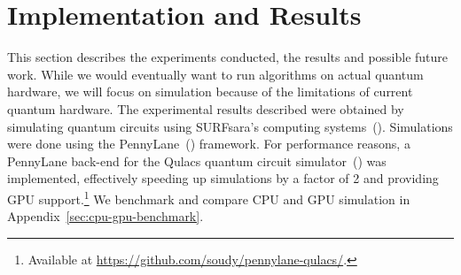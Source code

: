 \documentclass[a4paper,10pt]{article}
\begin{document}
\section{Implementation and Results} \label{sec:implementation-and-results}
This section describes the experiments conducted, the results and possible future work.
While we would eventually want to run algorithms on actual quantum hardware, we will focus on simulation because of the limitations of current quantum hardware.
The experimental results described were obtained by simulating quantum circuits using SURFsara's computing systems~(\cite{surfsara}).
Simulations were done using the PennyLane~(\cite{bergholm2018pennylane}) framework.
For performance reasons, a PennyLane back-end for the Qulacs quantum circuit simulator~(\cite{qulacs}) was implemented, effectively speeding up simulations by a factor of 2 and providing GPU support.\footnote{Available at \url{https://github.com/soudy/pennylane-qulacs/}.}
We benchmark and compare CPU and GPU simulation in Appendix~\ref{sec:cpu-gpu-benchmark}.
\end{document}
